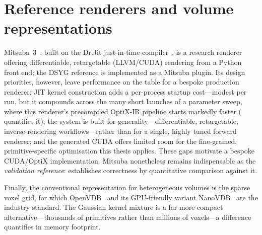 \section{Reference renderers and volume representations}
\label{sec:reference-renderers}

Mitsuba~3~\cite{Mitsuba3}, built on the Dr.Jit just-in-time compiler~\cite{DrJit}, is a research
renderer offering differentiable, retargetable (LLVM/CUDA) rendering from a Python front end; the
DSYG reference is implemented as a Mitsuba plugin. Its design priorities, however, leave performance
on the table for a bespoke production renderer: JIT kernel construction adds a per-process startup
cost---modest per run, but it compounds across the many short launches of a parameter sweep, where this
renderer's precompiled OptiX-IR pipeline starts markedly faster ( quantifies it); the
system is built for generality---differentiable, retargetable, inverse-rendering workflows---rather
than for a single, highly tuned forward renderer; and the generated CUDA offers limited room for the
fine-grained, primitive-specific optimisation this thesis applies. These gaps motivate a bespoke CUDA/OptiX implementation. Mitsuba nonetheless remains
indispensable as the \emph{validation reference}:  establishes correctness by
quantitative comparison against it.

Finally, the conventional representation for heterogeneous volumes is the sparse voxel grid, for
which OpenVDB~\cite{OpenVDB} and its GPU-friendly variant NanoVDB~\cite{NanoVDB} are the industry
standard. The Gaussian kernel mixture is a far more compact alternative---thousands of primitives
rather than millions of voxels---a difference  quantifies in memory footprint.
